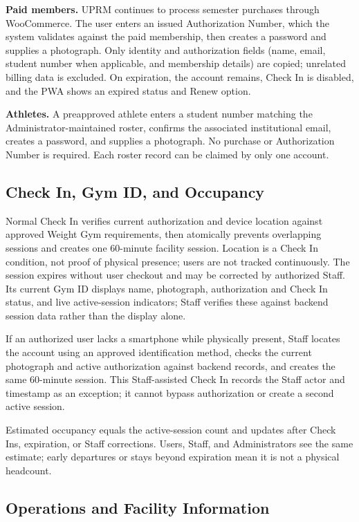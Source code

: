 \documentclass[11pt,letterpaper]{article}
\begin{document}
\textbf{Paid members.} UPRM continues to process semester purchases through WooCommerce. The user enters an issued Authorization Number, which the system validates against the paid membership, then creates a password and supplies a photograph. Only identity and authorization fields (name, email, student number when applicable, and membership details) are copied; unrelated billing data is excluded. On expiration, the account remains, Check In is disabled, and the PWA shows an expired status and Renew option.

\textbf{Athletes.} A preapproved athlete enters a student number matching the Administrator-maintained roster, confirms the associated institutional email, creates a password, and supplies a photograph. No purchase or Authorization Number is required. Each roster record can be claimed by only one account.

\subsection{Check In, Gym ID, and Occupancy}

Normal Check In verifies current authorization and device location against approved Weight Gym requirements, then atomically prevents overlapping sessions and creates one 60-minute facility session. Location is a Check In condition, not proof of physical presence; users are not tracked continuously. The session expires without user checkout and may be corrected by authorized Staff. Its current Gym ID displays name, photograph, authorization and Check In status, and live active-session indicators; Staff verifies these against backend session data rather than the display alone.

If an authorized user lacks a smartphone while physically present, Staff locates the account using an approved identification method, checks the current photograph and active authorization against backend records, and creates the same 60-minute session. This Staff-assisted Check In records the Staff actor and timestamp as an exception; it cannot bypass authorization or create a second active session.

Estimated occupancy equals the active-session count and updates after Check Ins, expiration, or Staff corrections. Users, Staff, and Administrators see the same estimate; early departures or stays beyond expiration mean it is not a physical headcount.

\subsection{Operations and Facility Information}
\end{document}
